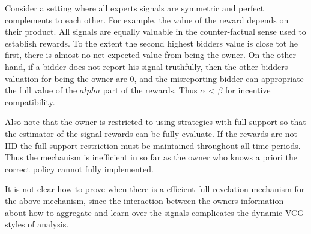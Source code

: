 Consider a setting where all experts signals are symmetric and perfect complements to each other. For example, the value of the reward depends on their product.
All signals are equally valuable in the counter-factual sense used to establish rewards.
To the extent the second highest bidders value is close tot he first, there is almost no net expected value from being the owner. On the other hand, if a bidder does not report his signal truthfully, then the other bidders valuation for being the owner are 0, and the misreporting bidder can appropriate the full value of the $alpha$ part of the rewards.
Thus $\alpha$ < $\beta$ for incentive compatibility. 

Also note that the owner is restricted to using strategies with full support so that the estimator of the signal rewards can be fully evaluate. If the rewards are not IID the full support restriction must be maintained throughout all time periods. 
Thus the mechanism is inefficient in so far as the owner who knows a priori the correct policy cannot fully implemented. 

It is not clear how to prove when there is a efficient full revelation mechanism for the above mechanism, since the interaction between the owners information about how to aggregate and learn over the signals complicates the dynamic VCG styles of analysis. 















